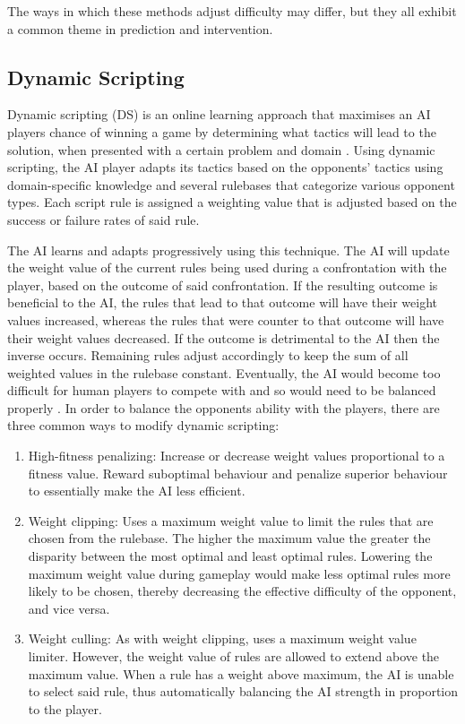 \documentclass[journal]{IEEEtran}
\begin{document}
The ways in which these methods adjust difficulty may differ, but they all exhibit a common theme in prediction and intervention.

\subsection{Dynamic Scripting}
Dynamic scripting (DS) is an online learning approach that maximises an AI players chance of winning a game by determining what tactics will lead to the solution, when presented with a certain problem and domain \cite{spronck2004online}. Using dynamic scripting, the AI player adapts its tactics based on the opponents' tactics using domain-specific knowledge and several rulebases that categorize various opponent types. Each script rule is assigned a weighting value that is adjusted based on the success or failure rates of said rule.

The AI learns and adapts progressively using this technique. The AI will update the weight value of the current rules being used during a confrontation with the player, based on the outcome of said confrontation. If the resulting outcome is beneficial to the AI, the rules that lead to that outcome will have their weight values increased, whereas the rules that were counter to that outcome will have their weight values decreased. If the outcome is detrimental to the AI then the inverse occurs. Remaining rules adjust accordingly to keep the sum of all weighted values in the rulebase constant.
Eventually, the AI would become too difficult for human players to compete with and so would need to be balanced properly \cite{liden2003artificial}. In order to balance the opponents ability with the players, there are three common ways to modify dynamic scripting:

\begin{enumerate}
\item High-fitness penalizing: Increase or decrease weight values proportional to a fitness value. Reward suboptimal behaviour and penalize superior behaviour to essentially make the AI less efficient.
\item Weight clipping: Uses a maximum weight value to limit the rules that are chosen from the rulebase. The higher the maximum value the greater the disparity between the most optimal and least optimal rules. Lowering the maximum weight value during gameplay would make less optimal rules more likely to be chosen, thereby decreasing the effective difficulty of the opponent, and vice versa.
\item Weight culling: As with weight clipping, uses a maximum weight value limiter. However, the weight value of rules are allowed to extend above the maximum value. When a rule has a weight above maximum, the AI is unable to select said rule, thus automatically balancing the AI strength in proportion to the player.
\end{enumerate}
\end{document}
